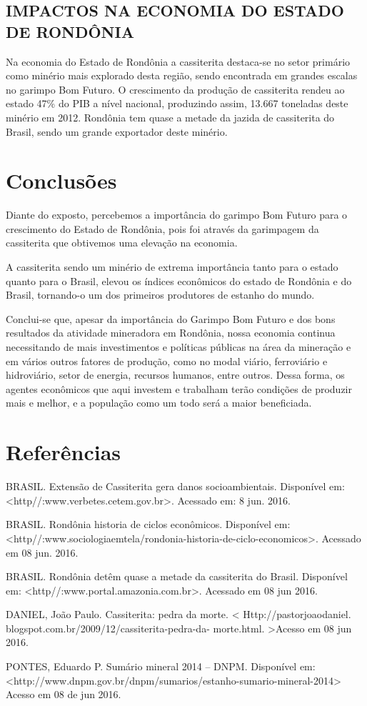 \documentclass[article,12pt,onesidea,4paper,english,brazil]{abntex2}
\begin{document}
\subsection{IMPACTOS NA ECONOMIA DO ESTADO DE RONDÔNIA}

	Na economia do Estado de Rondônia a cassiterita destaca-se no setor primário como minério mais explorado desta região, sendo encontrada em grandes escalas no garimpo Bom Futuro. O crescimento da produção de cassiterita rendeu ao estado 47\% do PIB a nível nacional, produzindo assim, 13.667 toneladas deste minério em 2012. Rondônia tem quase a metade da jazida de cassiterita do Brasil, sendo um grande exportador deste minério.
	
	\section*{Conclusões}
	
Diante do exposto, percebemos a importância do garimpo Bom Futuro para o crescimento do Estado de Rondônia, pois foi através da garimpagem da cassiterita que obtivemos uma elevação na economia.

A cassiterita sendo um minério de extrema importância tanto para o estado quanto para o Brasil, elevou os índices econômicos do estado de Rondônia e do Brasil, tornando-o um dos primeiros produtores de estanho do mundo.

Conclui-se que, apesar da importância do Garimpo Bom Futuro e dos bons resultados da atividade mineradora em Rondônia, nossa economia continua necessitando de mais investimentos e políticas públicas na área da mineração e em vários outros fatores de produção, como no modal viário, ferroviário e hidroviário, setor de energia, recursos humanos, entre outros. Dessa forma, os agentes econômicos que aqui investem e trabalham terão condições de produzir mais e melhor, e a população como um todo será a maior beneficiada.
	
	\section*{Referências}
	
	\sloppy
	
\noindent BRASIL. Extensão de Cassiterita gera danos socioambientais. Disponível em:
<http//:www.verbetes.cetem.gov.br>. Acessado em: 8 jun. 2016.

\noindent BRASIL. Rondônia historia de ciclos econômicos. Disponível em:<http//:www.sociologiaemtela/rondonia-historia-de-ciclo-economicos>. Acessado em 08 jun. 2016.

\noindent BRASIL. Rondônia detêm quase a metade da cassiterita do Brasil. Disponível em: <http//:www.portal.amazonia.com.br>. Acessado em 08 jun 2016.

\noindent DANIEL, João Paulo. Cassiterita: pedra da morte.
< Http://pastorjoaodaniel. blogspot.com.br/2009/12/cassiterita-pedra-da- morte.html. >Acesso em 08 jun 2016.

\noindent PONTES, Eduardo P. Sumário mineral 2014 – DNPM. Disponível em:
<http://www.dnpm.gov.br/dnpm/sumarios/estanho-sumario-mineral-2014> Acesso em 08 de jun 2016.
\end{document}
